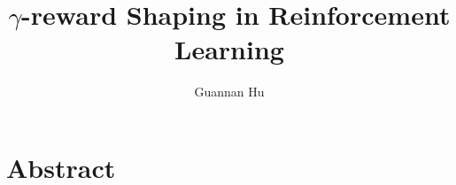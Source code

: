 \documentclass[12pt,a4paper]{article}
\begin{document}
\title{$\gamma$-reward Shaping in Reinforcement Learning}
\author{Guannan Hu}
\maketitle
\fi
\section*{Abstract}

\ifx\allfiles\undefined


\end{document}
